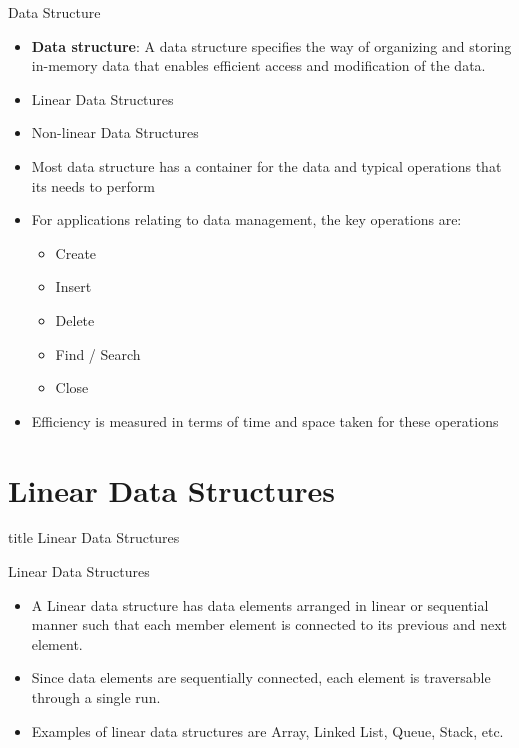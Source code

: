 \documentclass[aspectratio=169, xcolor=dvipsnames]{beamer}
\begin{document}
\begin{frame}{Data Structure}
    \begin{block}{}
        \begin{itemize}[<+->]
            \item \textbf{Data structure}: A data structure specifies the way of organizing and storing in-memory data that enables efficient access and modification of the data.
            \item Linear Data Structures
            \item Non-linear Data Structures
            \item Most data structure has a container for the data and typical operations that its needs to perform
            \item For applications relating to data management, the key operations are:
            \begin{itemize}[<+->]
                \item Create
                \item Insert
                \item Delete
                \item Find / Search
                \item Close
            \end{itemize}
            \item Efficiency is measured in terms of time and space taken for these operations
        \end{itemize}
    \end{block}
\end{frame}

\section{Linear Data Structures}
\begin{frame}
  \vfill
  \centering
  \begin{beamercolorbox}[sep=8pt,center,shadow=true,rounded=true]{title}
    Linear Data Structures\par%
  \end{beamercolorbox}
  \vfill
\end{frame}

\begin{frame}{Linear Data Structures}
    \begin{block}{}
        \begin{itemize}[<+->]
            \item A Linear data structure has data elements arranged in linear or sequential manner such that each member element is connected to its previous and next element.
            \item Since data elements are sequentially connected, each element is traversable through a single run.
            \item Examples of linear data structures are Array, Linked List, Queue, Stack, etc.
        \end{itemize}
    \end{block}
\end{frame}
\end{document}
